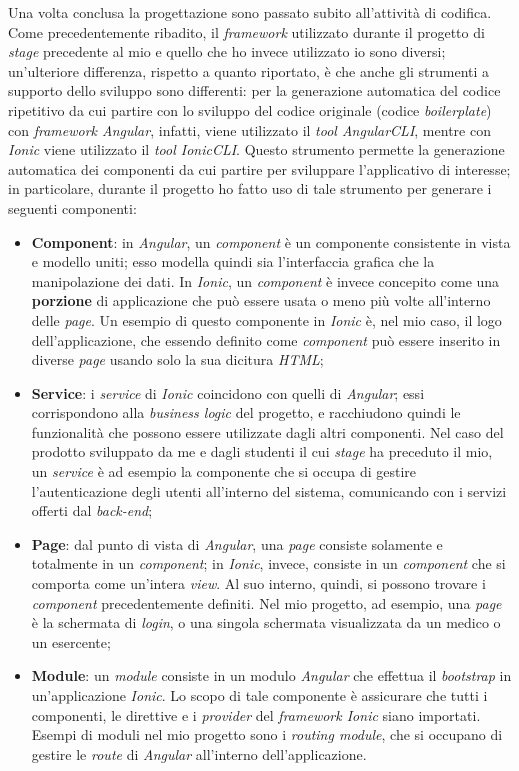 Una volta conclusa la progettazione sono passato subito all'attività di codifica. Come precedentemente ribadito, il \textit{framework} utilizzato durante il progetto di \textit{stage} precedente al mio e quello che ho invece utilizzato io sono diversi; un'ulteriore differenza, rispetto a quanto riportato, è che anche gli strumenti a supporto dello sviluppo sono differenti: per la generazione automatica del codice ripetitivo da cui partire con lo sviluppo del codice originale (codice \textit{boilerplate}) con \textit{framework Angular}, infatti, viene utilizzato il \textit{tool AngularCLI}, mentre con \textit{Ionic} viene utilizzato il \textit{tool IonicCLI}. Questo strumento permette la generazione automatica dei componenti da cui partire per sviluppare l'applicativo di interesse; in particolare, durante il progetto ho fatto uso di tale strumento per generare i seguenti componenti:
\begin{itemize}
  \item \textbf{Component}: in \textit{Angular}, un \textit{component} è un componente consistente in vista e modello uniti; esso modella quindi sia l'interfaccia grafica che la manipolazione dei dati. In \textit{Ionic}, un \textit{component} è invece concepito come una \textbf{porzione} di applicazione che può essere usata o meno più volte all'interno delle \textit{page}. Un esempio di questo componente in \textit{Ionic} è, nel mio caso, il logo dell'applicazione, che essendo definito come \textit{component} può essere inserito in diverse \textit{page} usando solo la sua dicitura \textit{HTML};
  \item \textbf{Service}: i \textit{service} di \textit{Ionic} coincidono con quelli di \textit{Angular}; essi corrispondono alla \textit{business logic} del progetto, e racchiudono quindi le funzionalità che possono essere utilizzate dagli altri componenti. Nel caso del prodotto sviluppato da me e dagli studenti il cui \textit{stage} ha preceduto il mio, un \textit{service} è ad esempio la componente che si occupa di gestire l'autenticazione degli utenti all'interno del sistema, comunicando con i servizi offerti dal \textit{back-end};
  \item \textbf{Page}: dal punto di vista di \textit{Angular}, una \textit{page} consiste solamente e totalmente in un \textit{component}; in \textit{Ionic}, invece, consiste in un \textit{component} che si comporta come un'intera \textit{view}. Al suo interno, quindi, si possono trovare i \textit{component} precedentemente definiti. Nel mio progetto, ad esempio, una \textit{page} è la schermata di \textit{login}, o una singola schermata visualizzata da un medico o un esercente;
  \item \textbf{Module}: un \textit{module} consiste in un modulo \textit{Angular} che effettua il \textit{bootstrap} in un'applicazione \textit{Ionic}. Lo scopo di tale componente è assicurare che tutti i componenti, le direttive e i \textit{provider} del \textit{framework Ionic} siano importati. Esempi di moduli nel mio progetto sono i \textit{routing module}, che si occupano di gestire le \textit{route} di \textit{Angular} all'interno dell'applicazione.
\end{itemize}


